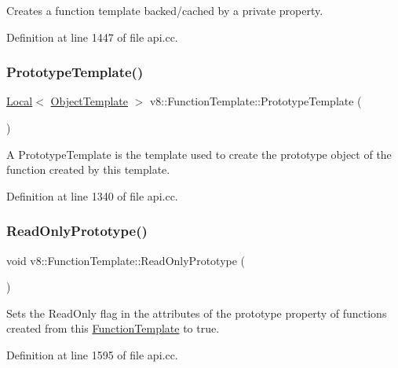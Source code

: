 Creates a function template backed/cached by a private property. 

Definition at line 1447 of file api.\+cc.

\mbox{\label{classv8_1_1FunctionTemplate_a086408da7fe81f69f0d3bbcb95e83cc7}} 
\subsubsection{\texorpdfstring{Prototype\+Template()}{PrototypeTemplate()}}
{\footnotesize\ttfamily \mbox{\hyperlink{classv8_1_1Local}{Local}}$<$ \mbox{\hyperlink{classv8_1_1ObjectTemplate}{Object\+Template}} $>$ v8\+::\+Function\+Template\+::\+Prototype\+Template (\begin{DoxyParamCaption}{ }\end{DoxyParamCaption})}

A Prototype\+Template is the template used to create the prototype object of the function created by this template. 

Definition at line 1340 of file api.\+cc.

\mbox{\label{classv8_1_1FunctionTemplate_a91d2e0643e8c5a53ab1d75f7766c2422}} 
\subsubsection{\texorpdfstring{Read\+Only\+Prototype()}{ReadOnlyPrototype()}}
{\footnotesize\ttfamily void v8\+::\+Function\+Template\+::\+Read\+Only\+Prototype (\begin{DoxyParamCaption}{ }\end{DoxyParamCaption})}

Sets the Read\+Only flag in the attributes of the \textquotesingle{}prototype\textquotesingle{} property of functions created from this \mbox{\hyperlink{classv8_1_1FunctionTemplate}{Function\+Template}} to true. 

Definition at line 1595 of file api.\+cc.

